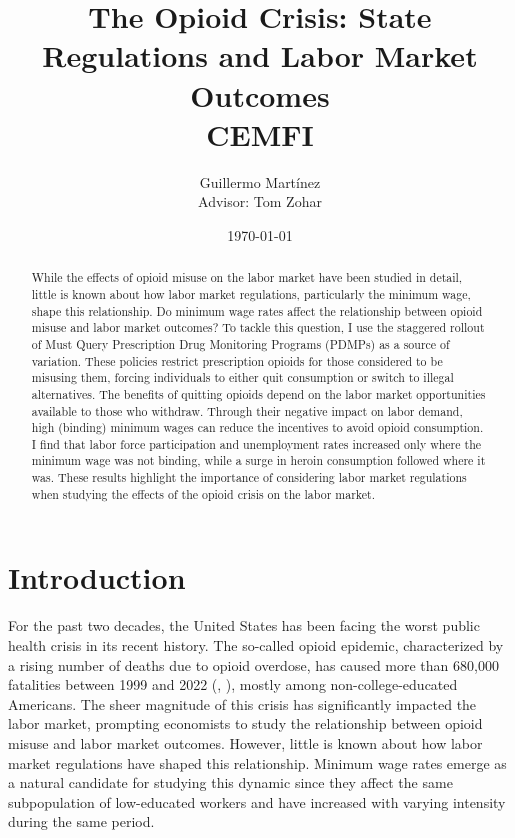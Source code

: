 \documentclass[12pt,a4paper]{article}
\title{The Opioid Crisis: State Regulations and Labor Market Outcomes \\
[2ex] \large CEMFI}
\author{Guillermo Martínez \\ [2ex] Advisor: Tom Zohar}
\date{\today}
\begin{document}
\maketitle

\begin{abstract}
    \noindent
    While the effects of opioid misuse on the labor market have been studied in detail, little is known about how labor market regulations, particularly the minimum wage, shape this relationship. Do minimum wage rates affect the relationship between opioid misuse and labor market outcomes? To tackle this question, I use the staggered rollout of Must Query Prescription Drug Monitoring Programs (PDMPs) as a source of variation. These policies restrict prescription opioids for those considered to be misusing them, forcing individuals to either quit consumption or switch to illegal alternatives. The benefits of quitting opioids depend on the labor market opportunities available to those who withdraw. Through their negative impact on labor demand, high (binding) minimum wages can reduce the incentives to avoid opioid consumption. I find that labor force participation and unemployment rates increased only where the minimum wage was not binding, while a surge in heroin consumption followed where it was. These results highlight the importance of considering labor market regulations when studying the effects of the opioid crisis on the labor market.
\end{abstract}

\newpage

\section*{Introduction}

For the past two decades, the United States has been facing the worst public health crisis in its recent history.
The so-called opioid epidemic, characterized by a rising number of deaths due to opioid overdose, has caused more than 680,000 fatalities between 1999 and 2022 (\cite{CDCMCD9920}, \cite{CDCMCD1822}), mostly among non-college-educated Americans.
The sheer magnitude of this crisis has significantly impacted the labor market, prompting economists to study the relationship between opioid misuse and labor market outcomes.
However, little is known about how labor market regulations have shaped this relationship.
Minimum wage rates emerge as a natural candidate for studying this dynamic since they affect the same subpopulation of low-educated workers and have increased with varying intensity during the same period.
\end{document}
